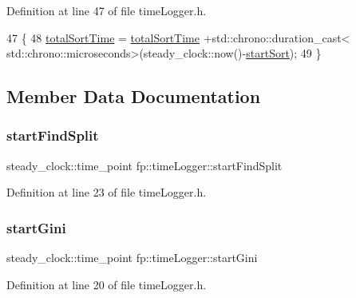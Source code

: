 Definition at line 47 of file time\+Logger.\+h.


\begin{DoxyCode}
47                                            \{
48 \hyperlink{classfp_1_1timeLogger_a3ac30f8dba0551c3cd3f57dc4806e56e}{totalSortTime} = \hyperlink{classfp_1_1timeLogger_a3ac30f8dba0551c3cd3f57dc4806e56e}{totalSortTime} +std::chrono::duration\_cast<
      std::chrono::microseconds>(steady\_clock::now()-\hyperlink{classfp_1_1timeLogger_afed53c702d6f414558eb7ca49f37ff22}{startSort});
49                 \}
\end{DoxyCode}


\subsection{Member Data Documentation}
\mbox{\label{classfp_1_1timeLogger_a1783656ae0d2e107cdfa87766ddc1a8c}} 
\subsubsection{\texorpdfstring{start\+Find\+Split}{startFindSplit}}
{\footnotesize\ttfamily steady\+\_\+clock\+::time\+\_\+point fp\+::time\+Logger\+::start\+Find\+Split}



Definition at line 23 of file time\+Logger.\+h.

\mbox{\label{classfp_1_1timeLogger_abe0bd7eeb79ad8c33747afb4f4a99e88}} 
\subsubsection{\texorpdfstring{start\+Gini}{startGini}}
{\footnotesize\ttfamily steady\+\_\+clock\+::time\+\_\+point fp\+::time\+Logger\+::start\+Gini}



Definition at line 20 of file time\+Logger.\+h.

\mbox{\label{classfp_1_1timeLogger_a530aa42af210e19fbab96c998271dbc4}} 
